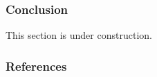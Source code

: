 \documentclass{beamer}
\begin{document}
\begin{frame}
    \frametitle{Conclusion}
        This section is under construction.
\end{frame}

\begin{frame}
    \frametitle{References}
     
    
\end{frame}
\end{document}
